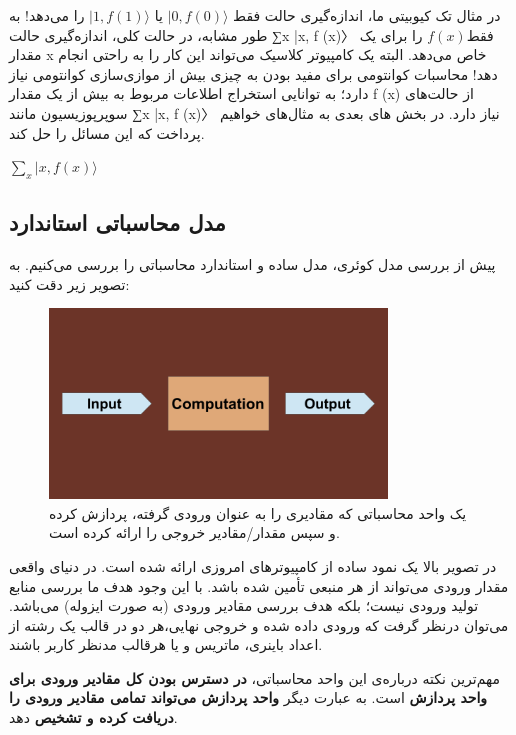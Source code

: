 \documentclass{book}
\begin{document}
در مثال تک کیوبیتی ما، اندازه‌گیری حالت فقط $\vert 0, f(0)\rangle$ یا $\vert 1, f(1)\rangle$ را می‌دهد! به طور مشابه، در حالت کلی، اندازه‌گیری حالت ∑x |x, f (x)〉 فقط$ f (x)$ را برای یک مقدار x خاص می‌دهد. البته یک کامپیوتر کلاسیک می‌تواند این کار را به راحتی انجام دهد! محاسبات کوانتومی برای مفید بودن به چیزی بیش از موازی‌سازی کوانتومی نیاز دارد؛ به توانایی استخراج اطلاعات مربوط به بیش از یک مقدار f (x) از حالت‌های سوپرپوزیسیون مانند ∑x |x, f (x)〉 نیاز دارد. 
در بخش های بعدی به مثال‌های خواهیم پرداخت که این مسائل را حل کند.



$\sum_{x} \vert x, f(x)\rangle$

\newpage
\subsection{مدل محاسباتی استاندارد}
پیش از بررسی مدل کوئری،‌ مدل ساده و استاندارد محاسباتی را بررسی می‌کنیم. به تصویر زیر دقت کنید:

\begin{figure}[ht]
	\centering
	\includegraphics[width=0.8\textwidth]{standard computation model.png}
	\caption{یک واحد محاسباتی که مقادیری را به عنوان ورودی گرفته، پردازش کرده و سپس مقدار/مقادیر خروجی را ارائه کرده است.}
\end{figure}


در تصویر بالا یک نمود ساده از کامپیوتر‌های امروزی ارائه شده است. در دنیای واقعی مقدار ورودی می‌تواند از هر منبعی‌ تأمین شده باشد. با این وجود هدف ما بررسی منابع تولید ورودی نیست؛‌ بلکه هدف بررسی مقادیر ورودی (به صورت ایزوله) می‌باشد. می‌توان درنظر گرفت که ورودی داده شده و خروجی نهایی،‌هر دو در قالب یک رشته از اعداد باینری، ماتریس و یا هرقالب مدنظر کاربر باشند.

مهم‌ترین نکته درباره‌ی این واحد محاسباتی،‌ \textbf{در دسترس بودن کل مقادیر ورودی برای واحد پردازش} است. به عبارت دیگر\textbf{ واحد پردازش می‌تواند تمامی مقادیر ورودی را دریافت کرده و تشخیص} دهد. 
\end{document}

